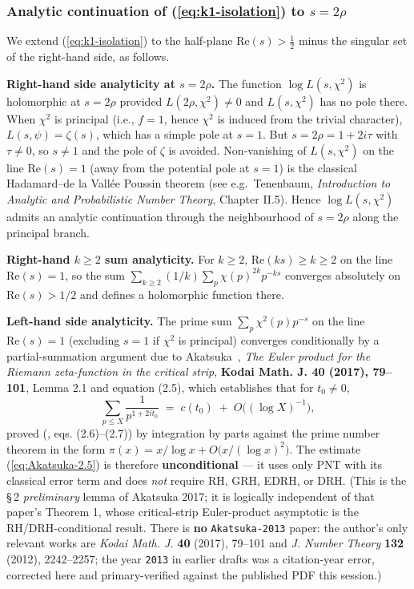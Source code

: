 \subsubsection{Analytic continuation of (\ref{eq:k1-isolation}) to \(s = 2\rho\)}

We extend (\ref{eq:k1-isolation}) to the half-plane \(\mathrm{Re}(s) > \tfrac12\) minus the singular set of the right-hand side, as follows.

\textbf{Right-hand side analyticity at \(s = 2\rho\).} The function
\(\log L(s, \chi^2)\) is holomorphic at \(s = 2\rho\) provided
\(L(2\rho, \chi^2) \ne 0\) and \(L(s, \chi^2)\) has no pole there. When
\(\chi^2\) is principal (i.e., \(f = 1\), hence \(\chi^2\) is induced from
the trivial character), \(L(s, \psi) = \zeta(s)\), which has a simple
pole at \(s = 1\). But \(s = 2\rho = 1 + 2i\tau\) with \(\tau \ne 0\), so
\(s \ne 1\) and the pole of \(\zeta\) is avoided. Non-vanishing of
\(L(s, \chi^2)\) on the line \(\mathrm{Re}(s) = 1\) (away from the
potential pole at \(s = 1\)) is the classical Hadamard--de la Vallée
Poussin theorem (see e.g.~Tenenbaum, \emph{Introduction to Analytic and
Probabilistic Number Theory}, Chapter II.5). Hence
\(\log L(s, \chi^2)\) admits an analytic continuation through the
neighbourhood of \(s = 2\rho\) along the principal branch.

\textbf{Right-hand \(k \ge 2\) sum analyticity.} For \(k \ge 2\),
\(\mathrm{Re}(ks) \ge k \ge 2\) on the line \(\mathrm{Re}(s) = 1\), so the
sum \(\sum_{k \ge 2} (1/k) \sum_p \chi(p)^{2k} p^{-ks}\) converges
absolutely on \(\mathrm{Re}(s) > 1/2\) and defines a holomorphic
function there.

\textbf{Left-hand side analyticity.} The prime sum
\(\sum_{p} \chi^2(p) p^{-s}\) on the line \(\mathrm{Re}(s) = 1\)
(excluding \(s = 1\) if \(\chi^2\) is principal) converges conditionally
by a partial-summation argument due to Akatsuka~\cite{Akatsuka2017EulerProduct}, \emph{The Euler
product for the Riemann zeta-function in the critical strip},
\textbf{Kodai Math. J. 40 (2017), 79--101}, Lemma 2.1 and equation (2.5),
which establishes that for \(t_0 \ne 0\),
\begin{equation}
\label{eq:Akatsuka-2.5}
\sum_{p \le X} \frac{1}{p^{1 + 2it_0}} \;=\; c(t_0) \;+\; O\!\bigl((\log X)^{-1}\bigr),
\end{equation}
proved (\cite{Akatsuka2017EulerProduct}, eqs. (2.6)--(2.7)) by integration by parts
against the prime number theorem in the form
\(\pi(x) = x/\log x + O\bigl(x/(\log x)^2\bigr)\). The estimate
(\ref{eq:Akatsuka-2.5}) is therefore \textbf{unconditional} --- it uses
only PNT with its classical error term and does \emph{not} require RH,
GRH, EDRH, or DRH. (This is the \S\,2 \emph{preliminary} lemma of Akatsuka
2017; it is logically independent of that paper's Theorem 1, whose
critical-strip Euler-product asymptotic is the RH/DRH-conditional
result. There is \textbf{no} \texttt{Akatsuka-2013} paper: the author's only
relevant works are \emph{Kodai Math. J.} \textbf{40} (2017), 79--101 and \emph{J.
Number Theory} \textbf{132} (2012), 2242--2257; the year \texttt{2013} in
earlier drafts was a citation-year error, corrected here and
primary-verified against the published PDF this session.)

